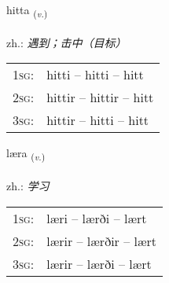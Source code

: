 \documentclass[frontgrid, backgrid]{flacards}\usepackage[]{graphicx}\usepackage[]{xcolor}
\begin{document}
\renewcommand{\blhead}{\vskip5pt {\small\bfseries\footnotesize Sagnorð | 动词 }}
\renewcommand{\bcfoot}{\vskip5pt \hspace{2pt}{\small\bfseries\footnotesize 1K}}


{hitta \small{\textsubscript{(\textit{v.})}} \\[1ex] %
\textphonetic{[hɪhta]} \\
zh.: \emph{遇到；击中（目标）} \\  [2ex]
\renewcommand*{\arraystretch}{0.8}
\begin{tabular}{p{1cm}l}
\textsc{1sg}: & hitti -- hitti -- hitt \\ 
\textsc{2sg}: & hittir -- hittir -- hitt \\ 
\textsc{3sg}: & hittir -- hitti -- hitt \\ 
\end{tabular}
}

\renewcommand{\flhead}{\vskip5pt \fboxsep=0pt {\small\bfseries\footnotesize Sagnorð | 动词}}
\renewcommand{\fcfoot}{\vskip5pt \fboxsep=0pt \hspace{2pt}{\small\bfseries\footnotesize 1K}}

\renewcommand{\blhead}{\vskip5pt {\small\bfseries\footnotesize Sagnorð | 动词 }}
\renewcommand{\bcfoot}{\vskip5pt \hspace{2pt}{\small\bfseries\footnotesize 1K}}


{læra \small{\textsubscript{(\textit{v.})}} \\[1ex] %
\textphonetic{[laiːra]} \\
zh.: \emph{学习} \\  [2ex]
\renewcommand*{\arraystretch}{0.8}
\begin{tabular}{p{1cm}l}
\textsc{1sg}: & læri -- lærði -- lært \\ 
\textsc{2sg}: & lærir -- lærðir -- lært \\ 
\textsc{3sg}: & lærir -- lærði -- lært \\ 
\end{tabular}
}
\end{document}
